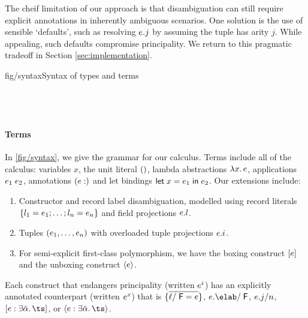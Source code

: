 \documentclass[acmsmall,screen,nonacm]{acmart}
\begin{document}

The cheif limitation of our approach is that disambiguation can still
require explicit annotations in inherently ambiguous scenarios. One solution
is the use of sensible `defaults', such as resolving $e.j$ by
assuming the tuple has arity $j$. While appealing, such defaults compromise
principality. We return to this pragmatic tradeoff in Section
\ref{sec:implementation}.

\begin{bnffig}{fig/syntax}{Syntax of types and terms}
\\[1ex]
\\
\\
\\
\end{bnffig}

\paragraph{Terms}

In \cref {fig/syntax}, we give the grammar for our calculus. Terms
include all of the
\ML calculus: variables $x$, the unit literal $()$, lambda abstractions
$\lambda x. \, e$, applications $e_1 \; e_2$, annotations $(e : \relax)$ and
let bindings $\mathopen{}\mathrel{\mathsf{let}} x = e_1 \mathrel{\mathsf{in}} e_2$. Our extensions include:
\begin{enumerate}
\item
  Constructor and record label disambiguation, modelled using record
  literals $\{ l_1 = e_1; \ldots; l_n = e_n \}$ and field
  projections $e.l$.

\item
  Tuples $(e_1, \ldots, e_n)$ with overloaded tuple projections
  $e.i$.

\item
  For semi-explicit first-class polymorphism, we have the boxing construct
  $\epoly \e$  and the unboxing construct $\einst e$.

\end{enumerate}
Each construct that endangers principality (written $e^i$) has an
explicitly annotated counterpart (written $e^x$) that is $\{\overline{\ell / \mathrel{\mathsf{F}}\mathclose{} = e}\}$, $\eproj [\F] \e
\elab$, $\eproj [n] \e j$, $\epoly [\exi \tvs \ts] \e$, or $\einst [\exi
\tvs \ts] \e$.
\end{document}
